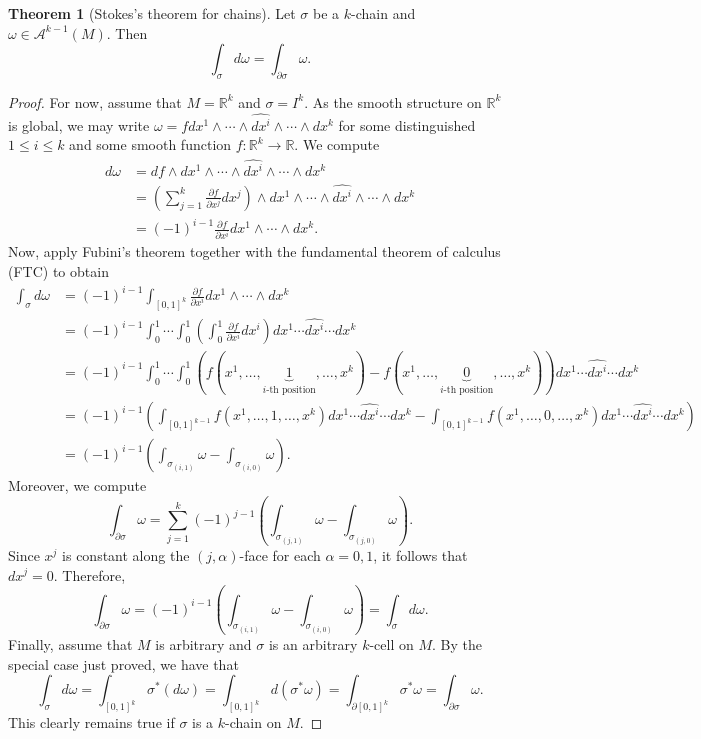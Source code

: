 \documentclass[10pt,letterpaper,cm]{nupset}
\theoremstyle{definition}
\theoremstyle{theorem}
\newtheorem{theorem}[definition]{Theorem}
\theoremstyle{remark}
\newcommand{\R}{\mathbb R}
\newcommand{\1}{\mathbf{1}}
\newcommand{\0}{\vec 0}
\begin{document}
\begin{theorem}[Stokes's theorem for chains]\label{chains}
Let $\sigma$ be a $k$-chain and $\omega \in \mathcal{A}^{k-1}(M)$. Then $$\int_{\sigma} d\omega = \int_{\partial{\sigma}} \omega.$$
\end{theorem}
\begin{proof}
For now, assume that $M= \R^k$ and $\sigma = I^k$. As the smooth structure on $\R^k$ is global, we may write $\omega = fdx^1 \wedge \cdots \wedge \widehat{dx^i} \wedge \cdots \wedge dx^k$ for some distinguished $1\leq i \leq k$ and some smooth function $f: \R^k \to \R$. We compute 
\begin{align*}
 d\omega & = df \wedge dx^1 \wedge \cdots \wedge \widehat{dx^i} \wedge \cdots \wedge dx^k
\\ & = \left(\sum_{j=1}^k\frac{\partial{f}}{\partial{x^j}}dx^j \right)\wedge dx^1 \wedge \cdots \wedge \widehat{dx^i} \wedge \cdots \wedge dx^k
\\ & = ({-1})^{i-1} \frac{\partial{f}}{\partial{x^i}}dx^1 \wedge \cdots \wedge dx^k.
\end{align*}
Now, apply Fubini's theorem  together with the fundamental theorem of calculus (FTC) to obtain
\begin{align*}
 \int_{\sigma}d\omega & = ({-1})^{i-1}\int_{\left[0,1\right]^k} \frac{\partial{f}}{\partial{x^i}}dx^1 \wedge \cdots \wedge dx^k
\\ & = ({-1})^{i-1}\int_0^1 \cdots \int_0^1 \left(\int_0^1  \frac{\partial{f}}{\partial{x^i}}dx^i \right)dx^1 \cdots \widehat{dx^i}  \cdots dx^k
\\ & = ({-1})^{i-1}\int_0^1 \cdots \int_0^1(f(x^1, \ldots, \underbrace{1}_{i\text{-th position}}, \ldots, x^k) - f(x^1, \ldots, \underbrace{0}_{i\text{-th position}}, \ldots, x^k))dx^1 \cdots \widehat{dx^i}  \cdots dx^k
\\ & =  ({-1})^{i-1}\left( \int_{\left[0,1\right]^{k-1}} f(x^1, \ldots, 1, \ldots, x^k)dx^1 \cdots \widehat{dx^i}  \cdots dx^k -\int_{\left[0,1\right]^{k-1}}f(x^1, \ldots, 0, \ldots, x^k)dx^1 \cdots \widehat{dx^i}  \cdots dx^k \right)
\\ & = ({-1})^{i-1}\left(\int_{\sigma_{(i, 1)}}\omega - \int_{\sigma_{(i, 0)}}\omega \right) .
\end{align*}
Moreover, we compute
$$ \int_{\partial{\sigma}}\omega = \sum_{j=1}^k({-1})^{j-1}\left(\int_{\sigma_{(j, 1)}}\omega - \int_{\sigma_{(j, 0)}}\omega \right).$$
Since $x^j$ is constant along the $\left(j, \alpha\right)$-face for each $\alpha = 0, 1$, it follows that $dx^j = 0$. Therefore, $$ \int_{\partial{\sigma}}\omega =   ({-1})^{i-1}\left(\int_{\sigma_{(i, 1)}}\omega - \int_{\sigma_{(i, 0)}}\omega \right) = \int_{\sigma} d\omega.$$
Finally, assume that $M$ is arbitrary and $\sigma $ is an arbitrary $k$-cell on $M$. By the special case just proved, we have that
$$  \int_{\sigma}d\omega = \int_{\left[0,1\right]^k}\sigma^{\ast}(d\omega) = \int_{\left[0,1\right]^k}d(\sigma^{\ast}\omega) = \int_{\partial{\left[0,1\right]^k}}\sigma^{\ast} \omega = \int_{\partial{\sigma}} \omega .$$
This clearly remains true if $\sigma$ is a $k$-chain on $M$.
\end{proof}
\end{document}
